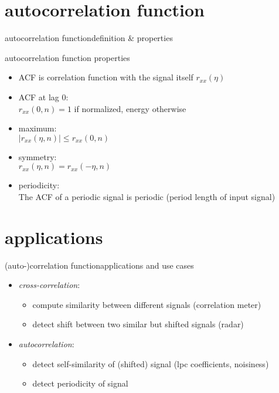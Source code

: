     \section[ACF]{autocorrelation function}
        \begin{frame}{autocorrelation function}{definition \& properties}
            \toremember{}
            \begin{block}{autocorrelation function properties}
                \begin{itemize}
                    \item   ACF is correlation function with the signal itself $r_{xx}(\eta)$
                    \item	{ACF} at lag $0$:\\
                    $r_{xx}(0,n) = 1$ if normalized, energy otherwise
                
                    \item	maximum:\\
                    $|r_{xx}(\eta,n)| \leq r_{xx}(0,n)$ 
                    \item	symmetry:\\
                    $r_{xx}(\eta,n) = r_{xx}(-\eta,n)$
                    \item	periodicity:\\
                    The {ACF} of a periodic signal is periodic (period length of input signal)
                \end{itemize}	
            \end{block}
        \end{frame}	

    \section[apps]{applications}
        \begin{frame}{(auto-)correlation function}{applications and use cases}
            
            \begin{itemize}
                \item   \textit{cross-correlation}:
                    \begin{itemize}
                        \item   compute similarity between different signals (correlation meter)
                        \item   detect shift between two similar but shifted signals (radar)
                    \end{itemize}
                \bigskip
                \item   \textit{autocorrelation}:
                    \begin{itemize}
                        \item   detect self-similarity of (shifted) signal (lpc coefficients, noisiness)
                        \item   detect periodicity of signal
                    \end{itemize}
            \end{itemize}
        \end{frame}	
        
